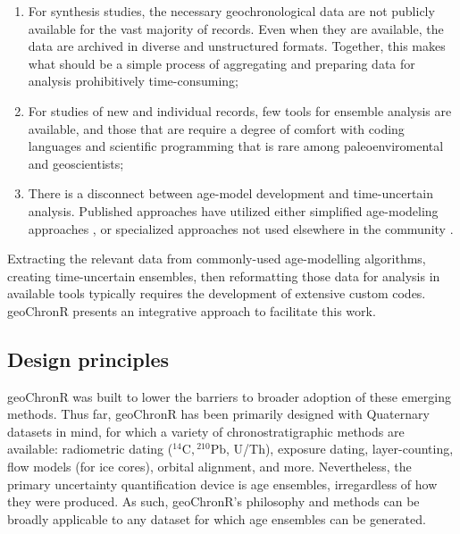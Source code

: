 \documentclass[gchron, manuscript]{copernicus}
\begin{document}
\begin{enumerate}
\def\labelenumi{\arabic{enumi}.}
\item
  For synthesis studies, the necessary geochronological data are not
  publicly available for the vast majority of records. Even when they
  are available, the data are archived in diverse and unstructured
  formats. Together, this makes what should be a simple process of
  aggregating and preparing data for analysis prohibitively
  time-consuming;
\item
  For studies of new and individual records, few tools for ensemble
  analysis are available, and those that are require a degree of comfort
  with coding languages and scientific programming that is rare among
  paleoenviromental and geoscientists;
\item
  There is a disconnect between age-model development and time-uncertain
  analysis. Published approaches have utilized either simplified
  age-modeling approaches
  \citep[e.g,][]{Haam_Huybers2010, routson2019mid}, or specialized
  approaches not used elsewhere in the community
  \citep[e.g.,][]{Marcott_Science2013, Tierney2013}.
\end{enumerate}

Extracting the relevant data from commonly-used age-modelling
algorithms, creating time-uncertain ensembles, then reformatting those
data for analysis in available tools typically requires the development
of extensive custom codes. geoChronR presents an integrative approach to
facilitate this work.

\subsection{Design principles}

geoChronR was built to lower the barriers to broader adoption of these
emerging methods. Thus far, geoChronR has been primarily designed with
Quaternary datasets in mind, for which a variety of chronostratigraphic
methods are available: radiometric dating
(\({}^{14}\mathrm{C}, {}^{210}\mathrm{Pb}\), U/Th), exposure dating,
layer-counting, flow models (for ice cores), orbital alignment, and
more. Nevertheless, the primary uncertainty quantification device is age
ensembles, irregardless of how they were produced. As such, geoChronR's
philosophy and methods can be broadly applicable to any dataset for
which age ensembles can be generated.
\end{document}
